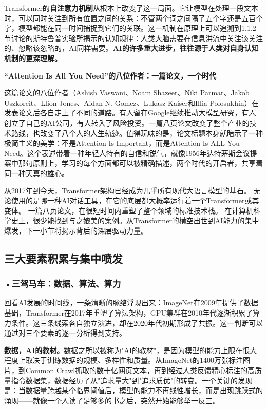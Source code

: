 Transformer的\textbf{自注意力机制}从根本上改变了这一局面。它让模型在处理一段文本时，可以同时关注到所有位置之间的关系：不管两个词之间隔了五个字还是五百个字，模型都能在同一时间捕捉到它们的关联。这一机制在原理上可以追溯到1.1.2节讨论的斯特鲁普实验所揭示的认知规律：人类大脑需要在信息洪流中关注该关注的、忽略该忽略的，AI同样需要。\textbf{AI的许多重大进步，往往源于人类对自身认知机制的更深理解。}

\begin{funbox}
\small\textbf{``Attention Is All You Need''的八位作者：一篇论文，一个时代}

这篇论文的八位作者（Ashish Vaswani、Noam Shazeer、Niki Parmar、Jakob Uszkoreit、Llion Jones、Aidan N. Gomez、Lukasz Kaiser和Illia Polosukhin）在发表论文后各自走上了不同的道路。有人留在Google继续推动大模型研究，有人创立了自己的AI公司，有人转入了风险投资。一篇八页论文改变了整个产业的技术路线，也改变了八个人的人生轨迹。值得玩味的是，论文标题本身就暗示了一种极简主义的美学：不是Attention Is Important，而是Attention Is ALL You Need。这个表述带着一种年轻人特有的自信和锐气，就像1956年达特茅斯会议提案中那句原则上，学习的每个方面都可以被精确描述，两个时代的开启者，共享着同一种天真的雄心。
\end{funbox}

从2017年到今天，Transformer架构已经成为几乎所有现代大语言模型的基石。
无论使用的是哪一种AI对话工具，在它的底层都大概率运行着一个Transformer或其变体。
一篇八页论文，在很短时间内重塑了整个领域的标准技术栈。
在计算机科学史上，很少能找到与之媲美的案例。从Transformer的横空出世到AI能力的集中爆发，下一小节将揭示背后的深层驱动力量。

\subsection{三大要素积累与集中喷发}

\subsubsection*{\textbf{•三驾马车：数据、算法、算力}}

回看AI发展的时间线，一条清晰的脉络浮现出来：ImageNet在2009年提供了数据基础，Transformer在2017年重塑了算法架构，GPU集群在2010年代逐渐积累了算力条件。这三条线索各自独立演进，却在2020年代初期形成了共振。这一判断可以通过对三个要素的逐一分析得到支持。

\textbf{数据，AI的教材。}数据之所以被称为"AI的教材"，是因为模型的能力上限在很大程度上取决于训练数据的规模、多样性和质量。从ImageNet的1400万张标注图片，到Common Crawl抓取的数十亿网页文本，再到经过人类反馈精心标注的高质量指令数据集，数据经历了从"追求量大"到"追求质优"的转变。一个关键的发现是：当数据量跨越某个临界阈值后，模型的能力不再线性增长，而是出现跳跃式的涌现——就像一个人读了足够多的书之后，突然开始能够举一反三。

